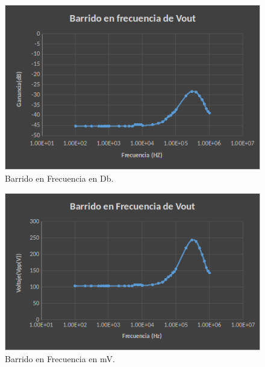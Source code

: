 \documentclass[letterpaper,12pt]{article}
\begin{document}
\begin{figure}[H]
	\centering
	\includegraphics[scale=0.7]{Grafica1}
	\caption{Barrido en Frecuencia en Db.}
	\label{Grafica1}
\end{figure}
\begin{figure}[H]
	\centering
	\includegraphics[scale=0.7]{Grafica2}
	\caption{Barrido en Frecuencia en mV.}
	\label{grafica2}
\end{figure}
\end{document}
